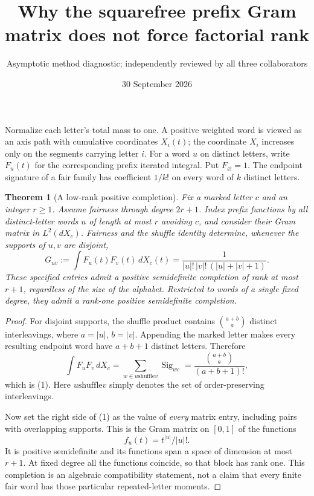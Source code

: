 \documentclass[11pt]{article}
\title{Why the squarefree prefix Gram matrix does not force factorial rank}
\author{Asymptotic method diagnostic; independently reviewed by all three collaborators}
\date{30 September 2026}
\newtheorem{theorem}{Theorem}\newtheorem{proposition}{Proposition}
\begin{document}
\maketitle
Normalize each letter's total mass to one. A positive weighted word
is viewed as an axis path with cumulative coordinates $X_i(t)$;
the coordinate $X_i$ increases only on the segments carrying letter
$i$. For a word $u$ on distinct letters, write $F_u(t)$ for the
corresponding prefix iterated integral. Put $F_{\varnothing}=1$.
The endpoint signature of a fair family has coefficient $1/k!$
on every word of $k$ distinct letters.

\begin{theorem}[A low-rank positive completion]\label{gram}
Fix a marked letter $c$ and an integer $r\ge1$. Assume fairness
through degree $2r+1$. Index prefix functions by all distinct-letter
words $u$ of length at most $r$ avoiding $c$, and consider their
Gram matrix in $L^2(dX_c)$.
Fairness and the shuffle identity determine, whenever the supports
of $u,v$ are disjoint,
\[
 G_{uv}:=\int F_u(t)F_v(t)\,dX_c(t)
       =\frac1{|u|!\,|v|!\,(|u|+|v|+1)}.       \tag{1}
\]
These specified entries admit a positive semidefinite completion
of rank at most $r+1$, regardless of the size of the alphabet.
Restricted to words of a single fixed degree, they admit a rank-one
positive semidefinite completion.
\end{theorem}
\begin{proof}
For disjoint supports, the shuffle product contains
$\binom{a+b}{a}$ distinct interleavings, where $a=|u|$, $b=|v|$.
Appending the marked letter makes every resulting endpoint word
have $a+b+1$ distinct letters. Therefore
\[
 \int F_uF_v\,dX_c
 =\sum_{w\in u\mathbin{\mathrm{shuffle}}v}\operatorname{Sig}_{wc}
 =\frac{\binom{a+b}{a}}{(a+b+1)!},
\]
which is (1). Here $u\mathbin{\mathrm{shuffle}}v$ simply denotes the set of
order-preserving interleavings.

Now set the right side of (1) as the value of \emph{every} matrix
entry, including pairs with overlapping supports. This is the Gram
matrix on $[0,1]$ of the functions
\[
 f_u(t)=t^{|u|}/|u|!.
\]
It is positive semidefinite and its functions span a space of
dimension at most $r+1$. At fixed degree all the functions coincide,
so that block has rank one. This completion is an algebraic
compatibility statement, not a claim that every finite fair word
has those particular repeated-letter moments.
\end{proof}
\end{document}

